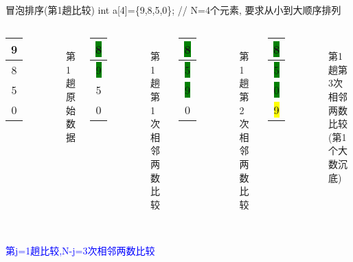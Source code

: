 \begin{frame}{冒泡排序(第1趟比较)}
int a[4]=\{9,8,5,0\}; // N=4个元素, 要求从小到大顺序排列
\begin{columns}[T]
	\begin{tabular}{|c|}
		\hline 
		9 \\ 
		\hline 
		8 \\ 
		\hline 
		5 \\ 
		\hline
		0 \\
	    \hline 
	\end{tabular}\\ 
    第1趟原始数据
	\pause
	\begin{tabular}{|c|}
		\hline 
		\colorbox{green}{8} \\ 
		\hline 
		\colorbox{green}{9} \\ 
		\hline 
		5 \\ 
		\hline
		0 \\
		\hline  
	\end{tabular}\\ 
    第1趟第1次相邻两数比较
    \pause
    \begin{tabular}{|c|}
    	\hline 
    	\colorbox{green}{8} \\ 
    	\hline 
    	\colorbox{green}{5} \\ 
    	\hline 
    	\colorbox{green}{9} \\ 
    	\hline 
    	0 \\
    	\hline 
    \end{tabular}\\ 
    第1趟第2次相邻两数比较
    \pause
    \begin{tabular}{|c|}
    	\hline 
    	\colorbox{green}{8} \\ 
    	\hline 
    	\colorbox{green}{5} \\ 
    	\hline 
    	\colorbox{green}{0} \\ 
    	\hline 
    	\colorbox{yellow}{9} \\
    	\hline 
    \end{tabular}\\ 
    第1趟第3次相邻两数比较(第1个大数沉底)
\end{columns}
~\\
\textcolor{blue}{第j=1趟比较,N-j=3次相邻两数比较}
\end{frame}

